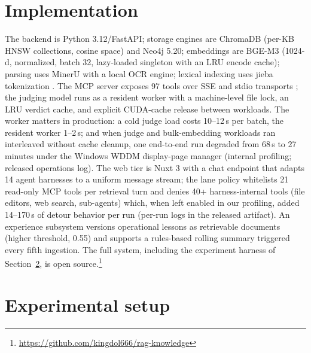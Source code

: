 \documentclass[preprint,12pt]{elsarticle}
\begin{document}
\section{Implementation}
\label{sec:impl}

The backend is Python 3.12/FastAPI; storage engines are ChromaDB (per-KB
HNSW \cite{hnsw} collections, cosine space) and Neo4j 5.20; embeddings are BGE-M3
\cite{bge-m3} (1024-d, normalized, batch 32, lazy-loaded singleton with an
LRU encode cache); parsing uses MinerU \cite{mineru} with a local OCR
engine; lexical indexing uses jieba tokenization \cite{jieba}. The MCP
server exposes 97 tools over SSE and stdio transports \cite{mcp}; the
judging model runs as a resident worker with a machine-level file lock, an
LRU verdict cache, and explicit CUDA-cache release between workloads. The
worker matters in production: a cold judge load costs 10--12\,s per batch,
the resident worker 1--2\,s; and when judge and bulk-embedding workloads
ran interleaved without cache cleanup, one end-to-end run degraded from 68\,s
to 27 minutes under the Windows WDDM display-page manager (internal
profiling; released operations log). The
web tier is Nuxt 3 with a chat endpoint that adapts 14 agent harnesses to a
uniform message stream; the lane policy whitelists 21 read-only MCP tools
per retrieval turn and denies 40+ harness-internal tools (file editors,
web search, sub-agents) which, when left enabled in our profiling, added
14--170\,s of detour behavior per run (per-run logs in the released
artifact). An experience subsystem versions operational
lessons as retrievable documents (higher threshold, 0.55) and supports a
rules-based rolling summary triggered every fifth ingestion. The full
system, including the experiment harness of Section~\ref{sec:setup}, is
open source.\footnote{\url{https://github.com/kingdol666/rag-knowledge}}

\section{Experimental setup}
\label{sec:setup}
\end{document}
